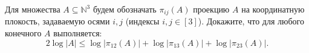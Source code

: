 Для множества $A \subseteq \mathbb{N}^3$ будем обозначать $\pi_{ij}(A)$ проекцию $A$ на координатную
плокость, задаваемую осями $i, j$ (индексы $i, j \in [3]$). Докажите, что для любого конечного $A$
выполняется:
$$
    2 \log |A| \le \log |\pi_{12}(A)| + \log |\pi_{13}(A)| + \log |\pi_{23}(A)|.
$$

